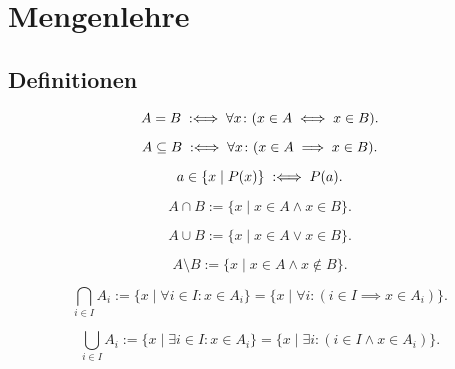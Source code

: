 \newpage
\section{Mengenlehre}
\subsection{Definitionen}

\begin{Definition}
\label{def:seteq}
\[A=B \;:\Longleftrightarrow\; \forall x\colon (x\in A\iff x\in B).\]
\end{Definition}

\begin{Definition}%
\label{def:subseteq}
\[A\subseteq B \;:\Longleftrightarrow\; \forall x\colon (x\in A\implies x\in B).\]
\end{Definition}

\begin{Definition}\label{def:filter}
\[a\in\{x\mid P(x)\} \;:\Longleftrightarrow\; P(a).\]
\end{Definition}

\begin{Definition}%
\label{def:cap}
\[A\cap B := \{x\mid x\in A\land x\in B\}.\]
\end{Definition}

\begin{Definition}%
\label{def:cup}
\[A\cup B := \{x\mid x\in A\lor x\in B\}.\]
\end{Definition}

\begin{Definition}%
\label{def:set-diff}
\[A\setminus B := \{x\mid x\in A\land x\notin B\}.\]
\end{Definition}

\begin{Definition}\label{def:intersection}
\[\bigcap_{i\in I} A_i := \{x\mid \forall i{\in}I\colon x\in A_i\}
= \{x\mid \forall i\colon (i\in I\implies x\in A_i)\}.\]
\end{Definition}

\begin{Definition}\label{def:union}
\[\bigcup_{i\in I} A_i := \{x\mid \exists i{\in}I\colon x\in A_i\}
= \{x\mid \exists i\colon (i\in I\land x\in A_i)\}.\]
\end{Definition}

